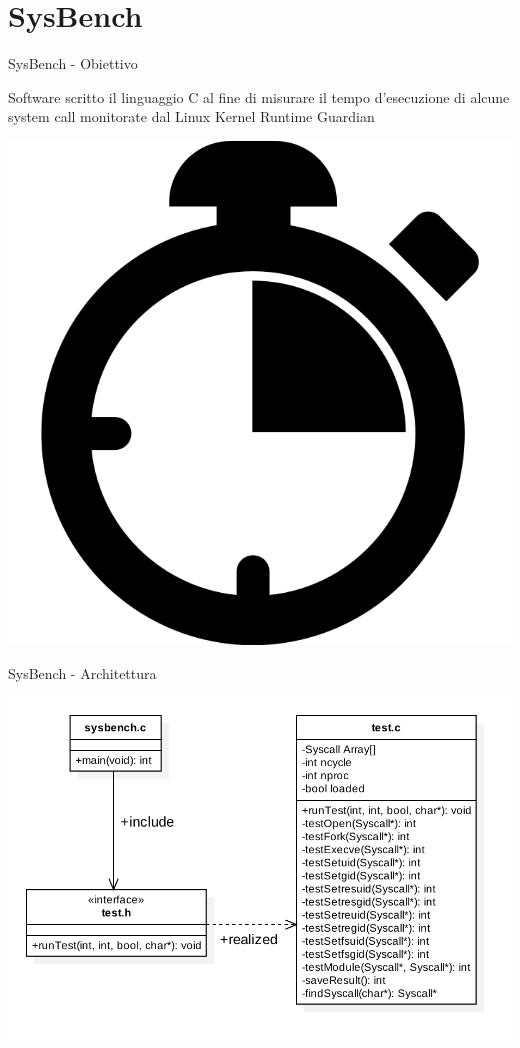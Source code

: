 \documentclass[12pt]{beamer}
\begin{document}
  \section{SysBench}
  \begin{frame}[fragile]{SysBench - Obiettivo}
    \begin{center}
    	Software scritto il linguaggio C al fine di misurare il tempo d'esecuzione di alcune system call monitorate dal Linux Kernel Runtime Guardian
    \end{center}
    \begin{center}
    	\includegraphics[scale=0.15]{res/Stopwatch}
    \end{center}
  \end{frame}
  \begin{frame}[fragile]{SysBench - Architettura}
    \begin{center}
    	\includegraphics[scale=0.3]{res/Architecture}
    \end{center}
  \end{frame}
\end{document}
